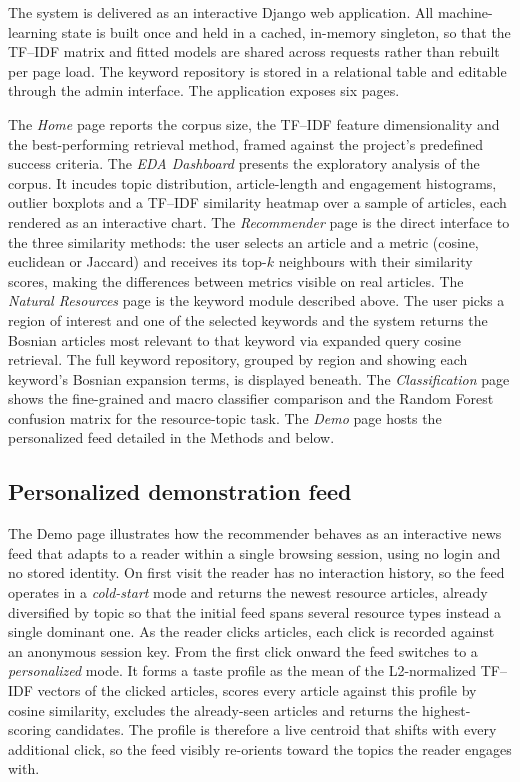 \documentclass[fleqn,10pt]{wlscirep}
\begin{document}
The system is delivered as an interactive Django web application. All machine-learning state is built once and held in a cached, in-memory singleton, so that the TF--IDF matrix and fitted models are shared across requests rather than rebuilt per page load. The keyword repository is stored in a relational table and editable through the admin interface. The application exposes six pages.

The \emph{Home} page reports the corpus size, the TF--IDF feature dimensionality and the best-performing retrieval method, framed against the project's predefined success criteria. The \emph{EDA Dashboard} presents the exploratory analysis of the corpus. It incudes topic distribution, article-length and engagement histograms, outlier boxplots and a TF--IDF similarity heatmap over a sample of articles, each rendered as an interactive chart. The \emph{Recommender} page is the direct interface to the three similarity methods: the user selects an article and a metric (cosine, euclidean or Jaccard) and receives its top-$k$ neighbours with their similarity scores, making the differences between metrics visible on real articles. The \emph{Natural Resources} page is the keyword module described above. The user picks a region of interest and one of the selected keywords and the system returns the Bosnian articles most relevant to that keyword via expanded query cosine retrieval. The full keyword repository, grouped by region and showing each keyword's Bosnian expansion terms, is displayed beneath. The \emph{Classification} page shows the fine-grained and macro classifier comparison and the Random Forest confusion matrix for the resource-topic task. The \emph{Demo} page hosts the personalized feed detailed in the Methods and below.

\subsection*{Personalized demonstration feed}

The Demo page illustrates how the recommender behaves as an interactive news feed that adapts to a reader within a single browsing session, using no login and no stored identity. On first visit the reader has no interaction history, so the feed operates in a \emph{cold-start} mode and returns the newest resource articles, already diversified by topic so that the initial feed spans several resource types instead a single dominant one. As the reader clicks articles, each click is recorded against an anonymous session key. From the first click onward the feed switches to a \emph{personalized} mode. It forms a taste profile as the mean of the L2-normalized TF--IDF vectors of the clicked articles, scores every article against this profile by cosine similarity, excludes the already-seen articles and returns the highest-scoring candidates. The profile is therefore a live centroid that shifts with every additional click, so the feed visibly re-orients toward the topics the reader engages with.
\end{document}
